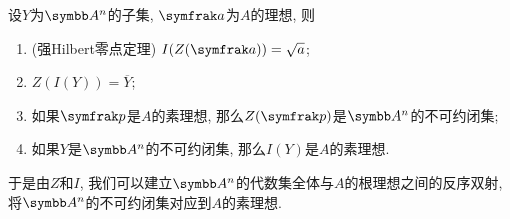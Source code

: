 \begin{proposition}\label{prop:affinegaloisconnectionclosedradical}
  设$Y$为$\AF^n$的子集, $\ideal{a}$为$A$的理想, 则
  \begin{enumerate}
    \item\label{enum:prop-affine-galois-connection-closed-radical-nullstellensatz} (强Hilbert零点定理) $I(Z(\ideal{a}))=\sqrt{a}$;
    \item\label{enum:prop-affine-galois-connection-closed-radical-closure} $Z(I(Y))=\overline{Y}$;
    \item\label{enum:prop-affine-galois-connection-closed-radical-8} 如果$\ideal{p}$是$A$的素理想, 那么$Z(\ideal{p})$是$\AF^n$的不可约闭集;
    \item\label{enum:prop-affine-galois-connection-closed-radical-9} 如果$Y$是$\AF^n$的不可约闭集, 那么$I(Y)$是$A$的素理想.
  \end{enumerate}
  于是由$Z$和$I$, 我们可以建立$\AF^n$的代数集全体与$A$的根理想之间的反序双射, 将$\AF^n$的不可约闭集对应到$A$的素理想.
\end{proposition}

